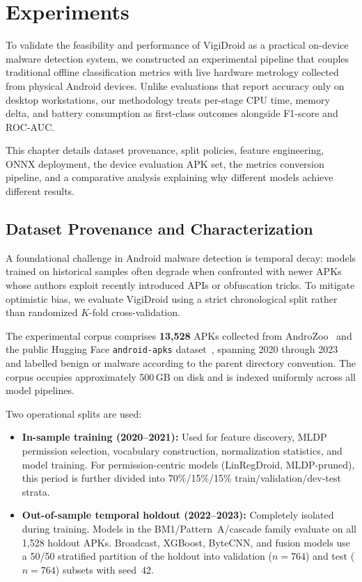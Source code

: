 \chapter{Experiments}\label{Experiment}

To validate the feasibility and performance of VigiDroid as a practical on-device malware detection system, we constructed an experimental pipeline that couples traditional offline classification metrics with live hardware metrology collected from physical Android devices. Unlike evaluations that report accuracy only on desktop workstations, our methodology treats per-stage CPU time, memory delta, and battery consumption as first-class outcomes alongside F1-score and ROC-AUC.

This chapter details dataset provenance, split policies, feature engineering, ONNX deployment, the device evaluation APK set, the metrics conversion pipeline, and a comparative analysis explaining why different models achieve different results.

\section{Dataset Provenance and Characterization}

A foundational challenge in Android malware detection is temporal decay: models trained on historical samples often degrade when confronted with newer APKs whose authors exploit recently introduced APIs or obfuscation tricks. To mitigate optimistic bias, we evaluate VigiDroid using a strict chronological split rather than randomized $K$-fold cross-validation.

The experimental corpus comprises \textbf{13,528} APKs collected from AndroZoo~\cite{androzoo} and the public Hugging Face \texttt{android-apks} dataset~\cite{androidapks}, spanning 2020 through 2023 and labelled benign or malware according to the parent directory convention. The corpus occupies approximately 500\,GB on disk and is indexed uniformly across all model pipelines.

Two operational splits are used:
\begin{itemize}
 \item \textbf{In-sample training (2020--2021):} Used for feature discovery, MLDP permission selection, vocabulary construction, normalization statistics, and model training. For permission-centric models (LinRegDroid, MLDP-pruned), this period is further divided into 70\%/15\%/15\% train/validation/dev-test strata.
 \item \textbf{Out-of-sample temporal holdout (2022--2023):} Completely isolated during training. Models in the BM1/Pattern~A/cascade family evaluate on all 1,528 holdout APKs. Broadcast, XGBoost, ByteCNN, and fusion models use a 50/50 stratified partition of the holdout into validation ($n{=}764$) and test ($n{=}764$) subsets with seed~42.
\end{itemize}

